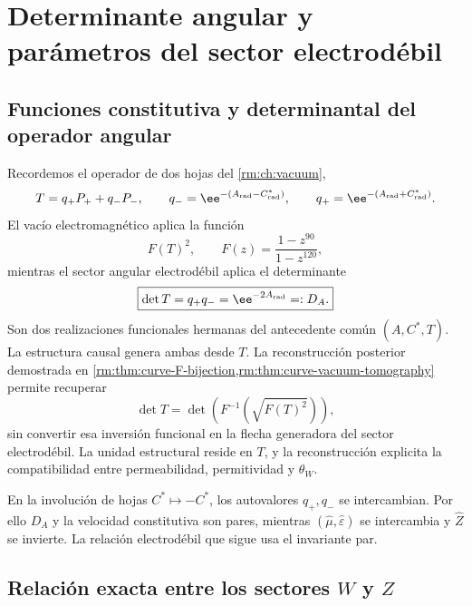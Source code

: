 \section{Determinante angular y par\'ametros del sector electrod\'ebil}
\label{rm:ch:ew}

\subsection{Funciones constitutiva y determinantal del operador angular}

Recordemos el operador de dos hojas del \cref{rm:ch:vacuum},
\begin{equation}
\label{rm:eq:ew-angular-operator}
T=q_+P_+ +q_-P_-,
\qquad
q_-=\ee^{-(A_{\rm rad}-C^*_{\rm rad})},
\qquad
q_+=\ee^{-(A_{\rm rad}+C^*_{\rm rad})}.
\end{equation}
El vac\'io electromagn\'etico aplica la funci\'on
\begin{equation}
\label{rm:eq:ew-vacuum-reader}
F(T)^2,
\qquad
F(z)=\frac{1-z^{90}}{1-z^{120}},
\end{equation}
mientras el sector angular electrod\'ebil aplica el determinante
\begin{equation}
\label{rm:eq:ew-determinant-reader}
\boxed{
\det T=q_+q_-=\ee^{-2A_{\rm rad}}=:D_A.}
\end{equation}
Son dos realizaciones funcionales hermanas del antecedente com\'un
\((A,C^*,T)\). La estructura causal genera ambas desde \(T\). La
reconstrucci\'on posterior demostrada en
\cref{rm:thm:curve-F-bijection,rm:thm:curve-vacuum-tomography} permite recuperar
\[
 \det T
 =\det\!\left(F^{-1}\!\left(\sqrt{F(T)^2}\right)\right),
\]
sin convertir esa inversi\'on funcional en la flecha generadora del sector
electrod\'ebil. La unidad estructural reside en \(T\), y la reconstrucci\'on
explicita la compatibilidad entre permeabilidad, permitividad y
\(\theta_W\).

En la involuci\'on de hojas \(C^*\mapsto-C^*\), los autovalores
\(q_+,q_-\) se intercambian. Por ello \(D_A\) y la velocidad constitutiva
son pares, mientras \((\widehat\mu,\widehat\varepsilon)\) se intercambia y
\(\widehat Z\) se invierte. La relaci\'on electrod\'ebil que sigue usa el
invariante par.

\subsection{Relaci\'on exacta entre los sectores \texorpdfstring{\(W\)}{W} y \texorpdfstring{\(Z\)}{Z}}

